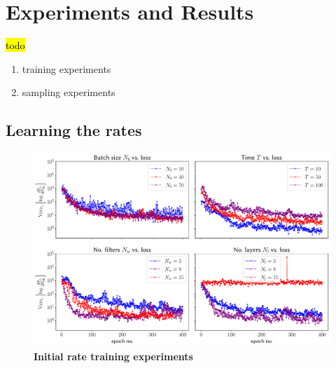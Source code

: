 \ifpdf
\graphicspath{{Chapter5/Figs/Raster/}{Chapter5/Figs/PDF/}{Chapter5/Figs/}}
\else
\graphicspath{{Chapter5/Figs/Vector/}{Chapter5/Figs/}}
\fi


\chapter{Experiments and Results}
\label{chapter5}
\hl{todo}
\begin{enumerate}
	\item training experiments
	\item sampling experiments
\end{enumerate}

\section{Learning the rates} 
\begin{figure}
	\centering
	\includegraphics[width=\linewidth]{Chapter5/Figs/Vector/init_test_learning}
	\caption[Initial rate training experiments]{\textbf{Initial rate training experiments}}
	\label{fig:inittestlearning}
\end{figure}

